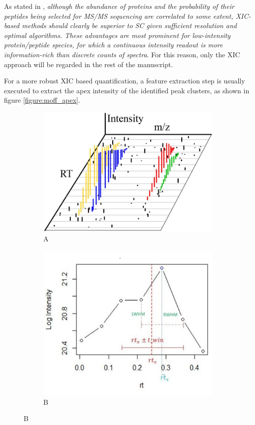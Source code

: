\documentclass[11pt, a4paper]{report}
\begin{document}
As stated in \cite{Cox2014}, \textit{although the abundance of proteins and the probability of their peptides being selected for \ac{MS/MS} sequencing are correlated to some extent, \ac{XIC}-based methods should clearly be superior to \ac{SC} given sufficient resolution and optimal algorithms. These advantages are most prominent for low-intensity protein/peptide species, for which a continuous intensity readout is more information-rich than discrete counts of spectra}. For this reason, only the \ac{XIC} approach will be regarded in the rest of the manuscript.  

For a more robust XIC based quantification, a feature extraction step is usually executed to extract the apex intensity of the identified peak clusters, as shown in figure \ref{figure:moff_apex}.

\begin{figure}[!h]
\centering
\begin{subfigure}{1\textwidth}
\centering
\caption*{A}
\includegraphics[width=0.7\linewidth]{apex_3d}
\end{subfigure}
\bigskip
\begin{subfigure}{1\textwidth}
\centering
\caption*{B}
\includegraphics[width=0.7\linewidth]{apex_intensity}

\end{subfigure}
\end{figure}
\end{document}
